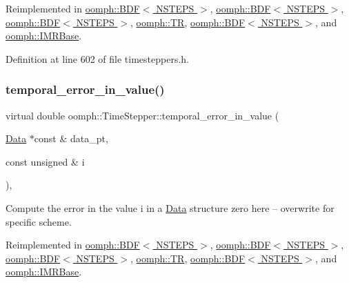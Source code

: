 Reimplemented in \hyperlink{classoomph_1_1BDF_ae4ef2e161fb944b7e6fcf6f7ee47579b}{oomph\+::\+B\+D\+F$<$ N\+S\+T\+E\+P\+S $>$}, \hyperlink{classoomph_1_1BDF_a858e48dd8330b67d2693a2c785adc75b}{oomph\+::\+B\+D\+F$<$ N\+S\+T\+E\+P\+S $>$}, \hyperlink{classoomph_1_1BDF_ad426b903004b13c34dd8df5ea2e1fec5}{oomph\+::\+B\+D\+F$<$ N\+S\+T\+E\+P\+S $>$}, \hyperlink{classoomph_1_1TR_ae77caf45f731bfc2cd5212f5934918d7}{oomph\+::\+TR}, \hyperlink{classoomph_1_1BDF_a77259e610f40a996c4e8d6151078ce94}{oomph\+::\+B\+D\+F$<$ N\+S\+T\+E\+P\+S $>$}, and \hyperlink{classoomph_1_1IMRBase_a6e57fd5364c261cd7c1bd49688899a13}{oomph\+::\+I\+M\+R\+Base}.



Definition at line 602 of file timesteppers.\+h.

\mbox{\label{classoomph_1_1TimeStepper_a27f66759f6d9b2040d26918adb998c78}} 
\subsubsection{\texorpdfstring{temporal\+\_\+error\+\_\+in\+\_\+value()}{temporal\_error\_in\_value()}}
{\footnotesize\ttfamily virtual double oomph\+::\+Time\+Stepper\+::temporal\+\_\+error\+\_\+in\+\_\+value (\begin{DoxyParamCaption}\item[{\hyperlink{classoomph_1_1Data}{Data} $\ast$const \&}]{data\+\_\+pt,  }\item[{const unsigned \&}]{i }\end{DoxyParamCaption})\hspace{0.3cm}{\ttfamily [inline]}, {\ttfamily [virtual]}}

Compute the error in the value i in a \hyperlink{classoomph_1_1Data}{Data} structure zero here -- overwrite for specific scheme. 

Reimplemented in \hyperlink{classoomph_1_1BDF_aab34e35252db11052c72ae7692825149}{oomph\+::\+B\+D\+F$<$ N\+S\+T\+E\+P\+S $>$}, \hyperlink{classoomph_1_1BDF_ab15c8dbf5716b7cb7dde42550b848528}{oomph\+::\+B\+D\+F$<$ N\+S\+T\+E\+P\+S $>$}, \hyperlink{classoomph_1_1BDF_a315c8cd00516e1e9ff4a0b7954050975}{oomph\+::\+B\+D\+F$<$ N\+S\+T\+E\+P\+S $>$}, \hyperlink{classoomph_1_1TR_afbaa1753914d49942f07b601563c2cec}{oomph\+::\+TR}, \hyperlink{classoomph_1_1BDF_a620de844b609fd064f405a5831d1defe}{oomph\+::\+B\+D\+F$<$ N\+S\+T\+E\+P\+S $>$}, and \hyperlink{classoomph_1_1IMRBase_aa51711d15be423119178f2b0c5ec8097}{oomph\+::\+I\+M\+R\+Base}.




